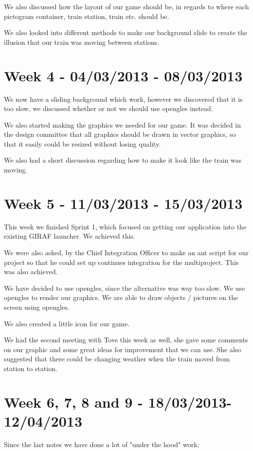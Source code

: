 We also discussed how the layout of our game should be, in regards to where each pictogram container, train station, train etc. should be. 

We also looked into different methods to make our background slide to create the illusion that our train was moving between stations. 

\section*{Week 4 - 04/03/2013 - 08/03/2013}
We now have a sliding background which work, however we discovered that it is too slow, we discussed whether or not we should use \ac{opengles} instead. 

We also started making the graphics we needed for our game. It was decided in the design committee that all graphics should be drawn in vector graphics, so that it easily could be resized without losing quality.  

We also had a short discussion regarding how to make it look like the train was moving.

\section*{Week 5 - 11/03/2013 - 15/03/2013}
This week we finished Sprint 1, which focused on getting our application into the existing GIRAF launcher. We achieved this. 

We were also asked, by the Chief Integration Officer to make an ant script for our project so that he could set up continues integration for the multiproject. This was also achieved. 

We have decided to use \ac{opengles}, since the alternative was way too slow. We use \ac{opengles} to render our graphics. We are able to draw objects / pictures on the screen using \ac{opengles}. 

We also created a little icon for our game. 

We had the second meeting with Tove this week as well, she gave some comments on our graphic and some great ideas for improvement that we can use. She also suggested that there could be changing weather when the train moved from station to station. 

\section*{Week 6, 7, 8 and 9 - 18/03/2013-12/04/2013}
Since the last notes we have done a lot of "under the hood" work:

